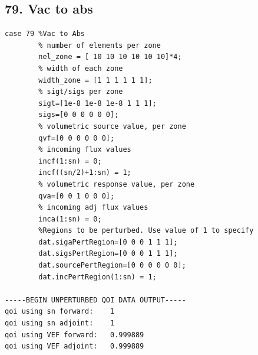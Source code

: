 \documentclass{article}
\begin{document}
\subsection{79. Vac to abs}
\begin{verbatim}
case 79 %Vac to Abs
        % number of elements per zone
        nel_zone = [ 10 10 10 10 10 10]*4;
        % width of each zone
        width_zone = [1 1 1 1 1 1];
        % sigt/sigs per zone
        sigt=[1e-8 1e-8 1e-8 1 1 1];
        sigs=[0 0 0 0 0 0];
        % volumetric source value, per zone
        qvf=[0 0 0 0 0 0];
        % incoming flux values
        incf(1:sn) = 0;
        incf((sn/2)+1:sn) = 1;
        % volumetric response value, per zone
        qva=[0 0 1 0 0 0];
        % incoming adj flux values
        inca(1:sn) = 0;
        %Regions to be perturbed. Use value of 1 to specify
        dat.sigaPertRegion=[0 0 0 1 1 1];
        dat.sigsPertRegion=[0 0 0 1 1 1];
        dat.sourcePertRegion=[0 0 0 0 0 0];
        dat.incPertRegion(1:sn) = 1;
        
-----BEGIN UNPERTURBED QOI DATA OUTPUT----- 
qoi using sn forward: 	 1 
qoi using sn adjoint: 	 1 
qoi using VEF forward: 	 0.999889 
qoi using VEF adjoint: 	 0.999889 
\end{verbatim}
\end{document}
